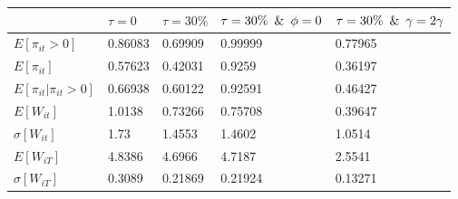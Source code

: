 \begin{tabular}{lllll}
& $\tau =0$ & $\tau =30\%$ & $\tau =30\% \hspace{0.5em}\& \hspace{0.5em} \phi = 0$ & $\tau =30\% \hspace{0.5em}\& \hspace{0.5em} \gamma = 2\gamma$ \\ 
\hline 
$E[\pi_{it}>0]$ & 0.86083 & 0.69909 & 0.99999 & 0.77965 \\ 
$E[\pi_{it}]$ & 0.57623 & 0.42031 & 0.9259 & 0.36197 \\ 
$E[\pi_{it}|\pi_{it}>0]$ & 0.66938 & 0.60122 & 0.92591 & 0.46427 \\ 
$E[W_{it}]$ & 1.0138 & 0.73266 & 0.75708 & 0.39647 \\ 
$\sigma[W_{it}]$ & 1.73 & 1.4553 & 1.4602 & 1.0514 \\ 
$E[W_{iT}]$ & 4.8386 & 4.6966 & 4.7187 & 2.5541 \\ 
$\sigma[W_{iT}]$ & 0.3089 & 0.21869 & 0.21924 & 0.13271 \\ 
\hline 
\end{tabular}